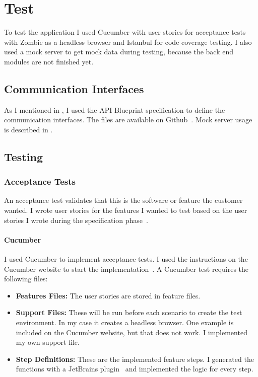 \chapter{Test}
\label{7-test}

To test the application I used Cucumber with user stories for acceptance tests with Zombie as a headless browser and Istanbul for code coverage testing. I also used a mock server to get mock data during testing, because the back end modules are not finished yet.

\section{Communication Interfaces}
As I mentioned in , I used the API Blueprint specification to define the communication interfaces. The files are available on Github~\cite{Github-blueprint}. Mock server usage is described in .


\section{Testing}
\subsection{Acceptance Tests}
An acceptance test validates that this is the software or feature the customer wanted. I wrote user stories  for the features I wanted to test based on the user stories I wrote during the specification phase~\cite{szofttech}.

\subsubsection{Cucumber}
\label{cucumber-test}

I used Cucumber  to implement acceptance tests. I used the instructions on the Cucumber website to start the implementation~\cite{github-cucumberjs}. A Cucumber test requires the following files:

\begin{itemize}
	\item \textbf{Features Files:} The user stories are stored in feature files.
	\item \textbf{Support Files:} These will be run before each scenario to create the test environment. In my case it creates a headless browser. One example is included on the Cucumber website, but that does not work. I implemented my own support file.
	\item \textbf{Step Definitions:} These are the implemented feature steps. I generated the functions with a JetBrains plugin~\cite{jetbrains-cucumber} and implemented the logic for every step. 
\end{itemize}

